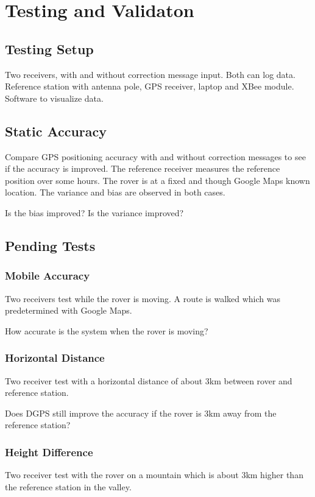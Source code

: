 \chapter{Testing and Validaton}

\section{Testing Setup}
Two receivers, with and without correction message input.
Both can log data.
Reference station with antenna pole, GPS receiver, laptop and XBee module.
Software to visualize data.

\section{Static Accuracy}
Compare GPS positioning accuracy with and without correction messages to see if the accuracy is improved.
The reference receiver measures the reference position over some hours.
The rover is at a fixed and though Google Maps known location.
The variance and bias are observed in both cases.

Is the bias improved?
Is the variance improved?


\section{Pending Tests}

\subsection{Mobile Accuracy}
Two receivers test while the rover is moving.
A route is walked which was predetermined with Google Maps.

How accurate is the system when the rover is moving?

\subsection{Horizontal Distance}
Two receiver test with a horizontal distance of about 3km between rover and reference station.

Does DGPS still improve the accuracy if the rover is 3km away from the reference station?

\subsection{Height Difference}

Two receiver test with the rover on a mountain which is about 3km higher than the reference station in the valley.

